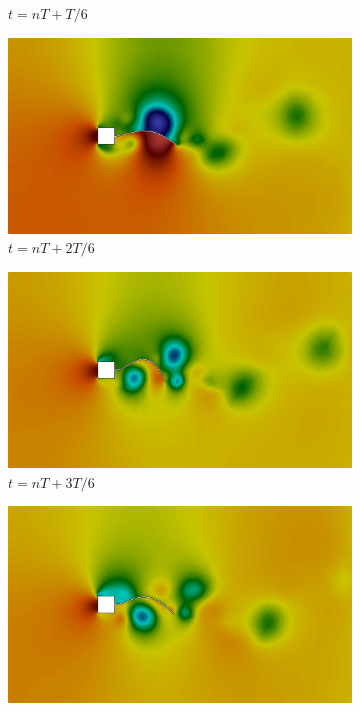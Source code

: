 \begin{figure}[h!]
\begin{subfigure}[b]{0.49\textwidth}
        \caption{$t=nT+T/6$}
    \end{subfigure}
    \begin{subfigure}[b]{0.49\textwidth}
        \includegraphics[width=\linewidth]{Figuras/FSI-prism/pT3.png}
        \caption{$t=nT+2T/6$}
    \end{subfigure}
    \begin{subfigure}[b]{0.49\textwidth}
        \includegraphics[width=\linewidth]{Figuras/FSI-prism/pT4.png}
        \caption{$t=nT+3T/6$}
    \end{subfigure}
    \begin{subfigure}[b]{0.49\textwidth}
        \includegraphics[width=\linewidth]{Figuras/FSI-prism/pT5.png}

\end{subfigure}
\end{figure}
